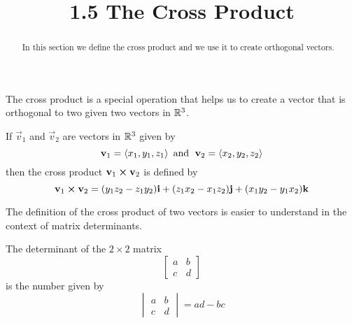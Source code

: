 \documentclass[handout]{ximera}
\title{1.5 The Cross Product}
\begin{document}
\begin{abstract}
In this section we define the cross product and we use it to create orthogonal vectors.
\end{abstract}
 
\maketitle
The cross product is a special operation that helps us to create a vector that is orthogonal to two given two vectors in $\mathbb R^3$.
\begin{definition}
If $\vec{v}_1$ and $\vec{v}_2$ are vectors in $\mathbb R^3$ given by
\[
\mathbf{v}_1 = \left\langle x_1, y_1, z_1\right\rangle \text{  and   } \;\mathbf{v}_2 = \left\langle x_2, y_2, z_2\right\rangle
\]
then the cross product $\mathbf{v}_1 \boldsymbol\times \mathbf{v}_2$ is defined by
\[
\mathbf{v}_1 \boldsymbol\times \mathbf{v}_2 =  (y_1z_2 - z_1y_2) \mathbf{i} + (z_1x_2 - x_1z_2) \mathbf{j} + (x_1y_2 - y_1x_2) \mathbf{k} 
\]
\end{definition}

The definition of the cross product of two vectors is easier to understand in the context of matrix determinants.

\begin{definition}
The determinant of the $2 \times 2$ matrix 
\[
\begin{bmatrix}
a & b\\
c & d
\end{bmatrix}
\]
is the number given by
\[
\begin{vmatrix}
a & b\\
c & d
\end{vmatrix}
= ad-bc
\]

\end{definition}
\end{document}
